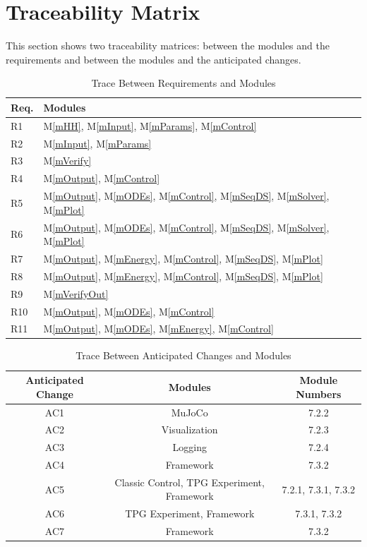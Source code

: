 \documentclass[12pt, titlepage]{article}
\newcommand{\mref}[1]{M\ref{#1}}
\begin{document}
\section{Traceability Matrix} \label{SecTM}

This section shows two traceability matrices: between the modules and the
requirements and between the modules and the anticipated changes.

\begin{table}[H]
\centering
\begin{tabular}{p{} p{}}
\toprule
\textbf{Req.} & \textbf{Modules}\\
\midrule
R1 & \mref{mHH}, \mref{mInput}, \mref{mParams}, \mref{mControl}\\
R2 & \mref{mInput}, \mref{mParams}\\
R3 & \mref{mVerify}\\
R4 & \mref{mOutput}, \mref{mControl}\\
R5 & \mref{mOutput}, \mref{mODEs}, \mref{mControl}, \mref{mSeqDS}, \mref{mSolver}, \mref{mPlot}\\
R6 & \mref{mOutput}, \mref{mODEs}, \mref{mControl}, \mref{mSeqDS}, \mref{mSolver}, \mref{mPlot}\\
R7 & \mref{mOutput}, \mref{mEnergy}, \mref{mControl}, \mref{mSeqDS}, \mref{mPlot}\\
R8 & \mref{mOutput}, \mref{mEnergy}, \mref{mControl}, \mref{mSeqDS}, \mref{mPlot}\\
R9 & \mref{mVerifyOut}\\
R10 & \mref{mOutput}, \mref{mODEs}, \mref{mControl}\\
R11 & \mref{mOutput}, \mref{mODEs}, \mref{mEnergy}, \mref{mControl}\\
\bottomrule
\end{tabular}
\caption{Trace Between Requirements and Modules}
\label{TblRT}
\end{table}

\begin{table}[H]
  \centering
  \begin{tabular}{|c|c|c|} \hline 
  \toprule
  Anticipated Change
  & Modules & Module Numbers
  \\
  \midrule
  AC1
  & MuJoCo & 7.2.2
  \\
  AC2
  & Visualization & 7.2.3
  \\
  AC3
  & Logging & 7.2.4
  \\
  AC4
  & Framework & 7.3.2
  \\
  AC5
  & Classic Control, TPG Experiment, Framework  & 7.2.1, 7.3.1, 7.3.2
  \\
  AC6
  & TPG Experiment, Framework & 7.3.1, 7.3.2
  \\
  AC7
  & Framework & 7.3.2
  \\
  \bottomrule
  \end{tabular}
  \caption{Trace Between Anticipated Changes and Modules}
  \label{TblACT}
  \end{table}
\end{document}
